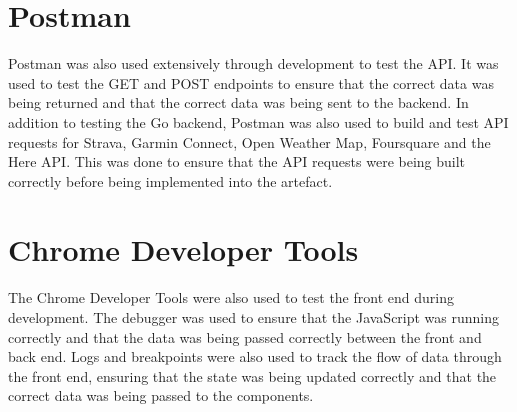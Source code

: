 \section{Postman}
\label{testing:postman}

Postman was also used extensively through development to test the API. It was used to test the GET and POST endpoints to ensure that the correct data was being returned and that the correct data was being sent to the backend. In addition to testing the Go backend, Postman was also used to build and test API requests for Strava, Garmin Connect, Open Weather Map, Foursquare and the Here API. This was done to ensure that the API requests were being built correctly before being implemented into the artefact.

\section{Chrome Developer Tools}
\label{testing:chrome-dev}

The Chrome Developer Tools were also used to test the front end during development. The debugger was used to ensure that the JavaScript was running correctly and that the data was being passed correctly between the front and back end. Logs and breakpoints were also used to track the flow of data through the front end, ensuring that the state was being updated correctly and that the correct data was being passed to the components.